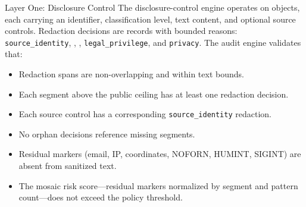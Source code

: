 \documentclass[
  ignorenonframetext,
]{beamer}
\providecommand{\tightlist}{%
  \setlength{\itemsep}{0pt}\setlength{\parskip}{0pt}}
\begin{document}
\begin{frame}{Layer One: Disclosure Control}
\protect{}\label{layer-one-disclosure-control}
The disclosure-control engine operates on 
objects, each carrying an identifier, classification level, text
content, and optional source controls. Redaction decisions are
 records with bounded reasons:
\texttt{source\_identity}, ,
, \texttt{legal\_privilege}, and
\texttt{privacy}. The audit engine validates that:

\begin{itemize}
\tightlist
\item
  Redaction spans are non-overlapping and within text bounds.
\item
  Each segment above the public ceiling has at least one redaction
  decision.
\item
  Each source control has a corresponding \texttt{source\_identity}
  redaction.
\item
  No orphan decisions reference missing segments.
\item
  Residual markers (email, IP, coordinates, NOFORN, HUMINT, SIGINT) are
  absent from sanitized text.
\item
  The mosaic risk score---residual markers normalized by segment and
  pattern count---does not exceed the policy threshold.
\end{itemize}
\end{frame}
\end{document}
